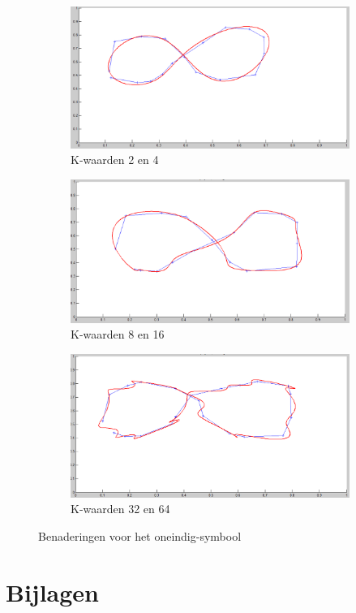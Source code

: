 \documentclass[a4paper, 12pt, titlepage]{report}
\begin{document}
\begin{figure}
\centering
\begin{subfigure}{.5\textwidth}
  \centering
  \includegraphics[width=\linewidth]{infsymbK4.png}
  \caption{K-waarden 2 en 4}
  \label{fig:infsub1}
\end{subfigure}%
\begin{subfigure}{.5\textwidth}
  \centering
  \includegraphics[width=\linewidth]{infsymbK8.png}
  \caption{K-waarden 8 en 16}
  \label{fig:infsub2}
\end{subfigure}
\begin{subfigure}{.5\textwidth}
  \centering
  \includegraphics[width=\linewidth]{infsymbK16.png}
  \caption{K-waarden 32 en 64}
  \label{fig:infsub3}
\end{subfigure}
\caption{Benaderingen voor het oneindig-symbool}
\label{fig:inf}
\end{figure}

\section{Bijlagen}








 
 
\end{document}
